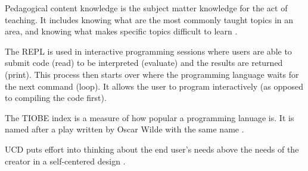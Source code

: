 \documentclass[../main.tex]{subfiles}
\begin{document}
  Pedagogical content knowledge is the subject matter knowledge for the act of teaching.
  It includes knowing what are the most commonly taught topics in an area,
  and knowing what makes specific topics difficult to learn
  \cite{shulmanThoseWhoUnderstand1986}.



  The REPL is used in interactive programming sessions where users are able to
  submit code (read) to be interpreted (evaluate) and the results are returned (print).
  This process then starts over where the programming language waits for the next command (loop).
  It allows the user to program interactively (as opposed to compiling the code first).



  The TIOBE index is a measure of how popular a programming lanuage is.
  It is named after a play written by Oscar Wilde with the same name
  \cite{IndexTIOBESoftware}.



  UCD puts effort into thinking about the end user's needs above the needs of the creator in a self-centered design
  \cite{pruittPersonaLifecycleKeeping2006, tognazziniTogSoftwareDesign1748}.

\end{document}
